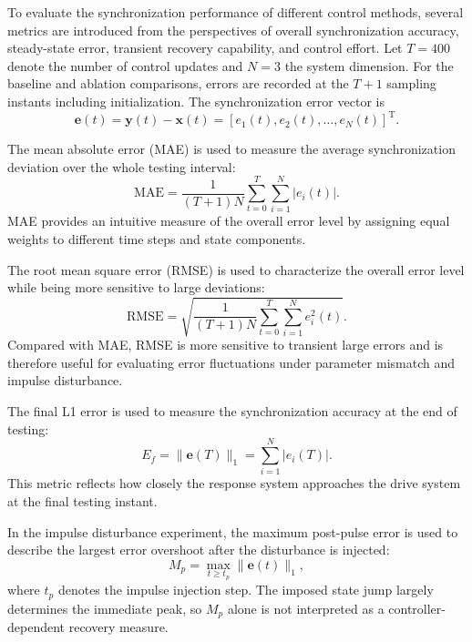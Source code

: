 \documentclass[a4paper,fleqn]{cas-dc}
\theoremstyle{plain}
\theoremstyle{definition}
\begin{document}
To evaluate the synchronization performance of different control methods, several metrics are introduced from the perspectives of overall synchronization accuracy, steady-state error, transient recovery capability, and control effort. Let $T=400$ denote the number of control updates and $N=3$ the system dimension. For the baseline and ablation comparisons, errors are recorded at the $T+1$ sampling instants including initialization. The synchronization error vector is
\begin{equation}
	\mathbf{e}(t)=\mathbf{y}(t)-\mathbf{x}(t)
	=
	[e_1(t),e_2(t),\ldots,e_N(t)]^{\mathrm T}.
	\label{eq:error_vector_metrics}
\end{equation}

The mean absolute error (MAE) is used to measure the average synchronization deviation over the whole testing interval:
\begin{equation}
	\mathrm{MAE}
	=
	\frac{1}{(T+1)N}
	\sum_{t=0}^{T}
	\sum_{i=1}^{N}
	|e_i(t)|.
	\label{eq:mae}
\end{equation}
MAE provides an intuitive measure of the overall error level by assigning equal weights to different time steps and state components.

The root mean square error (RMSE) is used to characterize the overall error level while being more sensitive to large deviations:
\begin{equation}
	\mathrm{RMSE}
	=
	\sqrt{
		\frac{1}{(T+1)N}
		\sum_{t=0}^{T}
		\sum_{i=1}^{N}
		e_i^2(t)
	}.
	\label{eq:rmse}
\end{equation}
Compared with MAE, RMSE is more sensitive to transient large errors and is therefore useful for evaluating error fluctuations under parameter mismatch and impulse disturbance.

The final L1 error is used to measure the synchronization accuracy at the end of testing:
\begin{equation}
	E_f=\|\mathbf{e}(T)\|_1
	=
	\sum_{i=1}^{N}|e_i(T)|.
	\label{eq:final_l1_error}
\end{equation}
This metric reflects how closely the response system approaches the drive system at the final testing instant.

In the impulse disturbance experiment, the maximum post-pulse error is used to describe the largest error overshoot after the disturbance is injected:
\begin{equation}
	M_p=\max_{t\geq t_p}\|\mathbf{e}(t)\|_1,
	\label{eq:max_post_pulse_error}
\end{equation}
where $t_p$ denotes the impulse injection step. The imposed state jump largely determines the immediate peak, so $M_p$ alone is not interpreted as a controller-dependent recovery measure.
\end{document}
